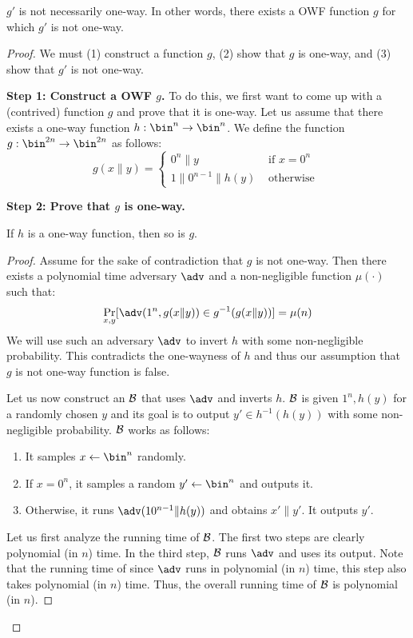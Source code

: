 \begin{claim}
$g'$ is not necessarily one-way. In other words, there exists a OWF function $g$ for which $g'$ is not one-way.
\end{claim}
\begin{proof}
We must (1) construct a function $g$, (2) show that $g$ is one-way, and (3) show that $g'$ is not one-way.


\noindent\textbf{Step 1: Construct a OWF $g$.} 
To do this, we first want to come up with a (contrived) function $g$ and prove that it is one-way.
Let us assume that there exists a one-way function $h : \bin^n \rightarrow \bin^n$. We define the function $g : \bin^{2n} \rightarrow \bin^{2n}$ as follows:
$$
g(x\|y) = \begin{cases}
 0^{n}\|y &\text{    if } x = 0^n\\
1\|0^{n-1}\|h(y) &\text{    otherwise }
\end{cases}
$$

\noindent\textbf{Step 2: Prove that $g$ is one-way.}

\begin{claim}
If $h$ is a one-way function, then so is $g$.
\end{claim}
\begin{proof}
Assume for the sake of contradiction that $g$ is not one-way. Then there exists a polynomial time adversary $\adv$ and a non-negligible function $\mu(\cdot)$ such that:
$$
\Pr_{x,y}[\adv(1^n,g(x\|y)) \in g^{-1}(g(x\|y))] = \mu(n)
$$
We will use such an adversary $\adv$ to invert $h$ with some non-negligible probability. This contradicts the one-wayness of $h$ and thus our assumption that $g$ is not one-way function is false.

Let us now construct an $\mathcal{B}$ that uses $\adv$ and inverts $h$. $\mathcal{B}$ is given $1^n,h(y)$ for a randomly chosen $y$ and its goal is to output $y' \in h^{-1}(h(y))$ with some non-negligible probability. $\mathcal{B}$ works as follows:
\begin{enumerate}
\item It samples $x \gets \bin^n$ randomly.
\item If $x = 0^n$, it samples a random $y' \gets \bin^n$ and outputs it.
\item Otherwise, it runs $\adv(10^{n-1}\|h(y))$ and obtains $x' \| y'$. It outputs $y'$.
\end{enumerate}

Let us first analyze the running time of $\mathcal{B}$. The first two steps are clearly polynomial (in $n$) time. In the third step, $\mathcal{B}$ runs $\adv$ and uses its output. Note that the running time of since $\adv$ runs in polynomial (in $n$) time, this step also takes polynomial (in $n$) time. Thus, the overall running time of $\mathcal{B}$ is polynomial (in $n$).


\end{proof}
\end{proof}
